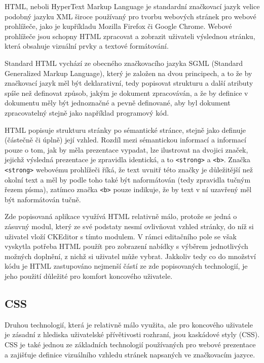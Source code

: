 \documentclass[a4paper,11pt]{article}
\begin{document}
HTML, neboli HyperText Markup Language je standardní značkovací jazyk velice podobný jazyku XML široce používaný pro tvorbu webových stránek pro webové prohlížeče, jako je kupříkladu Mozilla Firefox či Google Chrome. Webové prohlížeče jsou schopny HTML zpracovat a zobrazit uživateli výslednou stránku, která obsahuje vizuální prvky a textové formátování. 

Standard HTML vychází ze obecného značkovacího jazyka SGML (Standard Generalized Markup Language), který je založen na dvou principech, a to že by značkovací jazyk měl být deklarativní, tedy popisovat strukturu a další atributy spíše než definovat způsob, jakým je dokument zpracováván, a že by definice v dokumentu měly být jednoznačné a pevně definované, aby byl dokument zpracovatelný stejně jako například programový kód. %


HTML popisuje strukturu stránky po sémantické stránce, stejně jako definuje (částečně či úplně) její vzhled. Rozdíl mezi sémantickou informací a informací pouze o tom, jak by měla prezentace vypadat, lze ilustrovat na dvojici značek, jejichž výsledná prezentace je zpravidla identická, a to {\tt <strong>} a {\tt <b>}. Značka {\tt <strong>} webovému prohlížeči říká, že text uvnitř této značky je důležitější než okolní text a měl by podle toho také být naformátován (tedy zpravidla tučným řezem písma), zatímco značka {\tt <b>} pouze indikuje, že by text v ní uzavřený měl být naformátován tučně. %


Zde popisovaná aplikace využívá HTML relativně málo, protože se jedná o zásuvný modul, který ze své podstaty nesmí ovlivňovat vzhled stránky, do níž si uživatel vloží CKEditor s tímto modulem. V rámci editačního pole se však vyskytla potřeba HTML použít pro zobrazení nabídky s výběrem jednotlivých možných doplnění, z nichž si uživatel může vybrat. Jakkoliv tedy co do množství kódu je HTML zastupováno nejmenší částí ze zde popisovaných technologií, je jeho použití důležité pro komfort koncového uživatele.

\subsection{CSS}

Druhou technologií, která je relativně málo využita, ale pro koncového uživatele je zásadní z hlediska uživatelské přívětivosti rozhraní, jsou kaskádové styly (CSS). CSS je také jednou ze základních technologií používaných pro webové prezentace a zajišťuje definice vizuálního vzhledu stránek napsaných ve značkovacím jazyce.
\end{document}
